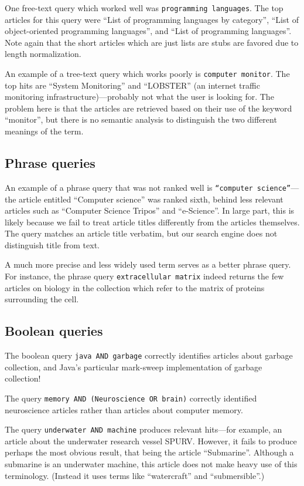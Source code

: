 \documentclass[11pt]{article}
\begin{document}
One free-text query which worked well was \texttt{programming languages}. The top articles
for this query were ``List of programming languages by category'',  ``List of object-oriented programming languages'',
and ``List of programming languages''. Note again that the short articles which are just lists are stubs
are favored due to length normalization.

An example of a tree-text query which works poorly is \texttt{computer monitor}. The top hits
are ``System Monitoring'' and ``LOBSTER'' (an internet traffic monitoring infrastructure)---probably
not what the user is looking for. The problem here is that the articles are retrieved based on their
use of the keyword ``monitor'', but there is no semantic analysis to distinguish the two different
meanings of the term.

\subsection{Phrase queries}

An example of a phrase query that was not ranked well is \texttt{``computer science''}---
the article entitled ``Computer science'' was ranked sixth, behind less relevant articles
such as ``Computer Science Tripos'' and ``e-Science''. In large part, this is likely because
we fail to treat article titles differently from the articles themselves. The query matches
an article title verbatim, but our search engine does not distinguish title from text.

A much more precise and less widely used term serves as a better phrase query. For instance,
the phrase query \texttt{extracellular matrix} indeed returns the few articles on biology
in the collection which refer to the matrix of proteins surrounding the cell.

\subsection{Boolean queries}

The boolean query \texttt{java AND garbage} correctly identifies articles about garbage collection,
and Java's particular mark-sweep implementation of garbage collection!

The query \texttt{memory AND (Neuroscience OR brain)} correctly identified neuroscience articles
rather than articles about computer memory.

The query \texttt{underwater AND machine} produces relevant hits---for example, an article
about the underwater research vessel SPURV. However, it fails to produce perhaps the most
obvious result, that being the article ``Submarine''. Although a submarine is an underwater machine,
this article does not make heavy use of this terminology. (Instead it uses terms like ``watercraft''
and ``submersible''.)
\end{document}
